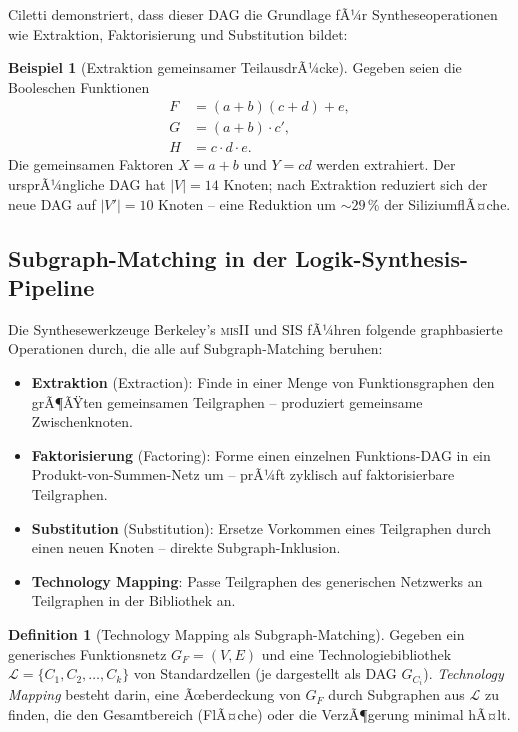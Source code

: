 ﻿\documentclass[a4paper,12pt]{article}
\theoremstyle{definition}
\newtheorem{definition}{Definition}
\newtheorem{beispiel}{Beispiel}
\begin{document}
Ciletti \cite[S.~238,\,Beispiel~6.2]{ciletti2011} demonstriert, dass dieser DAG die
Grundlage fÃ¼r Syntheseoperationen wie Extraktion, Faktorisierung und Substitution bildet:

\begin{beispiel}[Extraktion gemeinsamer TeilausdrÃ¼cke]\label{bsp:extraktion}
  Gegeben seien die Booleschen Funktionen
  \begin{align*}
    F &= (a + b)(c + d) + e, \\
    G &= (a + b) \cdot c', \\
    H &= c \cdot d \cdot e.
  \end{align*}
  Die gemeinsamen Faktoren $X = a + b$ und $Y = cd$ werden extrahiert. Der ursprÃ¼ngliche
  DAG hat $|V| = 14$ Knoten; nach Extraktion reduziert sich der neue DAG auf $|V'| = 10$
  Knoten -- eine Reduktion um $\sim 29\,\%$ der SiliziumflÃ¤che.
\end{beispiel}

\subsection{Subgraph-Matching in der Logik-Synthesis-Pipeline}

Die Synthesewerkzeuge Berkeley's \textsc{misII} und \textsc{SIS} \cite{brayton1987mis}
fÃ¼hren folgende graphbasierte Operationen durch, die alle auf Subgraph-Matching beruhen:

\begin{itemize}
  \item \textbf{Extraktion} (Extraction): Finde in einer Menge von Funktionsgraphen den
        grÃ¶ÃŸten gemeinsamen Teilgraphen -- produziert gemeinsame Zwischenknoten.
  \item \textbf{Faktorisierung} (Factoring): Forme einen einzelnen Funktions-DAG in ein
        Produkt-von-Summen-Netz um -- prÃ¼ft zyklisch auf faktorisierbare Teilgraphen.
  \item \textbf{Substitution} (Substitution): Ersetze Vorkommen eines Teilgraphen durch
        einen neuen Knoten -- direkte Subgraph-Inklusion.
  \item \textbf{Technology Mapping}: Passe Teilgraphen des generischen Netzwerks an
        Teilgraphen in der Bibliothek an.
\end{itemize}

\begin{definition}[Technology Mapping als Subgraph-Matching]
  Gegeben ein generisches Funktionsnetz $G_F = (V, E)$ und eine Technologiebibliothek
  $\mathcal{L} = \{C_1, C_2, \ldots, C_k\}$ von Standardzellen (je dargestellt als DAG
  $G_{C_i}$). \emph{Technology Mapping} besteht darin, eine Ãœberdeckung von $G_F$ durch
  Subgraphen aus $\mathcal{L}$ zu finden, die den Gesamtbereich (FlÃ¤che) oder die
  VerzÃ¶gerung minimal hÃ¤lt.
\end{definition}
\end{document}
